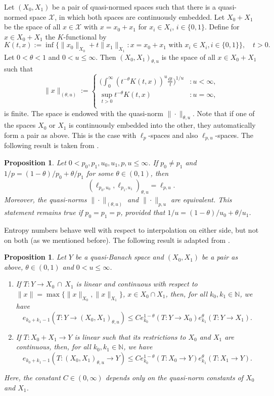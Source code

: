 \documentclass[a4paper,12pt]{article}
\newtheorem{prop}[thm]{Proposition}
\theoremstyle{definition}
\newcommand{\IN}{\mathbb{N}}
\newcommand{\dd}{\mathrm{d}}
\begin{document}
Let $(X_0,X_1)$ be a pair of quasi-normed spaces such that there is a quasi-normed space $\mathcal{X}$, in which both spaces are continuously embedded. Let $X_0+X_1$ be the space of all $x\in\mathcal{X}$ with $x=x_0+x_1$ for $x_i\in X_i$, $i\in\{0,1\}$. Define for $x\in X_0+X_1$ the $K$-functional by
\[
K(t,x):=\inf\big\{ \|x_0\|_{X_0}+t\|x_1\|_{X_1}\colon x=x_0+x_1\text{ with } x_i\in X_i, i\in\{0,1\}\big\},\quad t>0.
\]
Let $0<\theta<1$ and $0<u\le \infty$. Then $(X_0,X_1)_{\theta,u}$ is the space of all $x\in X_0+X_1$ such that  
\[
\|x\|_{(\theta,u)}
:=
\begin{cases}
\Big(\int_0^{\infty} (t^{-\theta}K(t,x))^u\frac{\dd t}{t}\Big)^{1/u}&\colon u<\infty,\\
\sup_{t>0} t^{-\theta}K(t,x)&\colon u=\infty,\\
\end{cases}
\]
is finite. The space is endowed with the quasi-norm $\|\cdot\|_{\theta,u}$. Note that if one of the spaces $X_0$ or $X_1$ is continuously embedded into the other, they automatically form a pair as above. This is the case with $\ell_p$-spaces and also $\ell_{p,u}$-spaces. The following result is taken from \cite[Theorem 5.3.1]{BL76}.

\begin{prop}\label{pro:reiter}
Let $0<p_0,p_1,u_0,u_1,p,u\le \infty$. If $p_0\neq p_1$ and $1/p=(1-\theta)/p_0+\theta/p_1$ for some $\theta \in (0,1)$, then
\[
(\ell_{p_0,u_0},\ell_{p_1,u_1})_{\theta,u}=\ell_{p,u}.
\]
Moreover, the quasi-norms $\|\cdot\|_{(\theta,u)}$ and $\|\cdot\|_{p,u}$ are equivalent. This statement remains true if $p_0=p_1=p$, provided that $1/u=(1-\theta)/u_0+\theta/u_1$.
\end{prop}

Entropy numbers behave well with respect to interpolation on either side, but not on both (as we mentioned before). The following result is adapted from \cite[Theorem 1.3.2]{ET96}.

\begin{prop}\label{pro:entropy-interpolation}
Let $Y$ be a quasi-Banach space and $(X_0,X_1)$ be a pair as above, $\theta\in (0,1)$ and $0<u\le \infty$.  
\begin{enumerate}
\item If $T\colon Y\to X_0\, \cap\, X_1$ is linear and continuous with respect to $\|x\|=\max\{\|x\|_{X_0},\|x\|_{X_1}\}$, $x\in X_0\cap X_1$, then, for all $k_0,k_1\in\IN$, we have
\[
e_{k_0+k_1-1}(T\colon Y\to (X_0,X_1)_{\theta,u})
\le C e_{k_0}^{1-\theta}(T\colon Y \to X_0) e_{k_1}^{\theta}(T\colon Y \to X_1).
\]
\item If $T\colon X_0+X_1\to Y$ is linear such that its restrictions to $X_0$ and $X_1$ are continuous, then, for all $k_0,k_1\in\IN$, we have
\[
e_{k_0+k_1-1}(T\colon (X_0,X_1)_{\theta,u}\to Y)
\le C e_{k_0}^{1-\theta}(T\colon X_0\to Y) e_{k_1}^{\theta}(T\colon  X_1\to Y).
\]
\end{enumerate}
Here, the constant $C\in(0,\infty)$ depends only on the quasi-norm constants of $X_0$ and $X_1$.
\end{prop}
\end{document}
